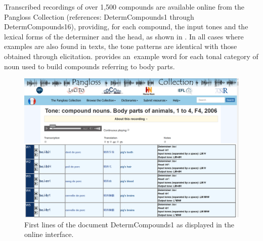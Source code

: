 Transcribed recordings of over 1,500 compounds are available online from the Pangloss Collection (references: DetermCompounds1 through DetermCompounds16), providing, for each compound, the input tones and the lexical forms of the determiner and the head, as shown in . In all cases where examples are also
found in texts, the tone
patterns are identical with those obtained through elicitation.  provides an~example word for each tonal category of noun used to build compounds referring to body parts.

\begin{figure}
	\includegraphics[width=\textwidth]{figures/CompOnPangloss.png}
	\caption{First lines of the document DetermCompounds1 as displayed in the online interface.}
	\label{fig:CompOnPangloss}
\end{figure}

